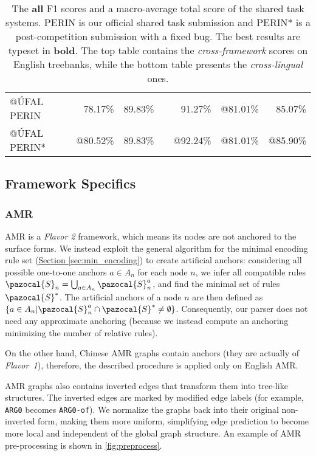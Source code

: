 \documentclass[11pt,a4paper]{article}
\newcommand{\secref}[1]{\hyperref[#1]{Section \ref*{#1}}}
\begin{document}
\begin{table*}[t]
\begin{tabular}{@{}lrrrrrr@{}}
@ÚFAL PERIN   & 78.17\% & 89.83\% & \- & 91.27\% &@81.01\% & 85.07\% \\
@ÚFAL PERIN*  &@80.52\% & 89.83\% & \- &@92.24\% &@81.01\% &@85.90\% \\ \bottomrule
\end{tabular}
\caption{The \textbf{all} F1 scores and a macro-average total score of the shared task systems. PERIN is our official shared task submission and PERIN* is a post-competition submission with a fixed bug. The best results are typeset in \textbf{bold}. The top table contains the  \emph{cross-framework} scores on English treebanks, while the bottom table presents the \emph{cross-lingual} ones.}
\label{tab:framework_result}
\end{table*}
 
\subsection{Framework Specifics}
\label{sec:specifics}

\subsubsection{AMR}
\label{sec:amr}

AMR is a \emph{Flavor 2} framework, which means its nodes are not anchored to the surface forms. We instead exploit the general algorithm for the minimal encoding rule set (\secref{sec:min_encoding}) to create artificial anchors: considering all possible one-to-one anchors $a \in A_n$ for each node $n$, we infer all compatible rules $\pazocal{S}_n = \bigcup_{a \in A_n} \pazocal{S}_n^a$, and find the minimal set of rules $\pazocal{S}^*$. The artificial anchors of a node $n$ are then defined as $\{a \in A_n \vert \pazocal{S}_n^a \cap \pazocal{S}^* \neq \emptyset \}$. Consequently, our parser does not need any approximate anchoring (because we instead compute an anchoring minimizing the number of relative rules).

On the other hand, Chinese AMR graphs contain anchors (they are actually of \hbox{\emph{Flavor 1}}), therefore, the described procedure is applied only on English AMR.

AMR graphs also contains inverted edges that transform them into tree-like structures. The inverted edges are marked by modified edge labels (for example, \texttt{ARG0} becomes \texttt{ARG0-of}). We normalize the graphs back into their original non-inverted form, making them more uniform, simplifying edge prediction to become more local and independent of the global graph structure. An example of AMR pre-processing is shown in \autoref{fig:preprocess}.
\end{document}
